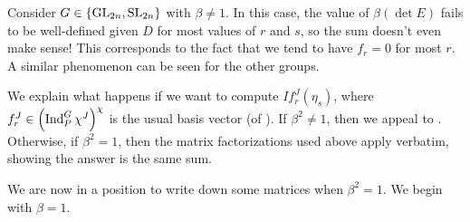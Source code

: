 \begin{remark}
	Consider $G\in\{\mathrm{GL}_{2n},\mathrm{SL}_{2n}\}$ with $\beta\ne1$. In this case, the value of $\beta(\det E)$ fails to be well-defined given $D$ for most values of $r$ and $s$, so the sum doesn't even make sense! This corresponds to the fact that we tend to have $f_r=0$ for most $r$. A similar phenomenon can be seen for the other groups.
\end{remark}
\begin{remark} \label{rem:i-on-fj}
	We explain what happens if we want to compute $If_r^J(\eta_s)$, where $f_r^J\in\left(\operatorname{Ind}_P^G\chi^J\right)^{\chi}$ is the usual basis vector (of ). If $\beta^2\ne1$, then we appeal to . Otherwise, if $\beta^2=1$, then the matrix factorizations used above apply verbatim, showing the answer is the same sum.
\end{remark}
We are now in a position to write down some matrices when $\beta^2=1$. We begin with $\beta=1$.
